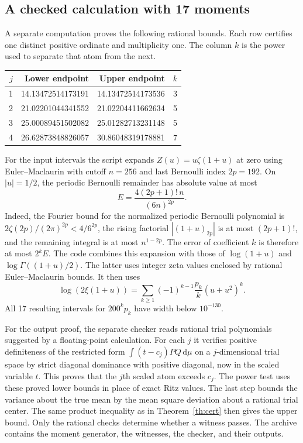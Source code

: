 \documentclass[11pt]{article}
\newcommand{\dd}{\,\mathrm d}
\begin{document}
\subsection*{A checked calculation with 17 moments}
A separate computation proves the following rational bounds. Each row certifies one distinct positive ordinate and multiplicity one. The column $k$ is the power used to separate that atom from the next.
\begin{center}
\begin{tabular}{rrrr}
\toprule
$j$ & Lower endpoint & Upper endpoint & $k$\\
\midrule
1 & 14.13472514173191 & 14.13472514173536 & 3\\
2 & 21.02201044341552 & 21.02204411662634 & 5\\
3 & 25.00089451502082 & 25.01282713231148 & 5\\
4 & 26.62873848826057 & 30.86048319178881 & 7\\
\bottomrule
\end{tabular}
\end{center}
For the input intervals the script expands $Z(u)=u\zeta(1+u)$ at zero using Euler--Maclaurin with cutoff $n=256$ and last Bernoulli index $2p=192$. On $|u|=1/2$, the periodic Bernoulli remainder has absolute value at most
\[
 E=\frac{4(2p+1)!\,n}{(6n)^{2p}}.
\]
Indeed, the Fourier bound for the normalized periodic Bernoulli polynomial is $2\zeta(2p)/(2\pi)^{2p}<4/6^{2p}$, the rising factorial $|(1+u)_{2p}|$ is at most $(2p+1)!$, and the remaining integral is at most $n^{1-2p}$. The error of coefficient $k$ is therefore at most $2^kE$. The code combines this expansion with those of $\log(1+u)$ and $\log\Gamma((1+u)/2)$. The latter uses integer zeta values enclosed by rational Euler--Maclaurin bounds. It then uses
\[
 \log(2\xi(1+u))=\sum_{k\ge1}(-1)^{k-1}\frac{p_k}{k}(u+u^2)^k.
\]
All 17 resulting intervals for $200^k p_k$ have width below $10^{-130}$.

For the output proof, the separate checker reads rational trial polynomials suggested by a floating-point calculation. For each $j$ it verifies positive definiteness of the restricted form $\int(t-c_j)PQ\dd\mu$ on a $j$-dimensional trial space by strict diagonal dominance with positive diagonal, now in the scaled variable $t$. This proves that the $j$th scaled atom exceeds $c_j$. The power test uses these proved lower bounds in place of exact Ritz values. The last step bounds the variance about the true mean by the mean square deviation about a rational trial center. The same product inequality as in Theorem~\ref{th:cert} then gives the upper bound. Only the rational checks determine whether a witness passes. The archive contains the moment generator, the witnesses, the checker, and their outputs.
\end{document}
